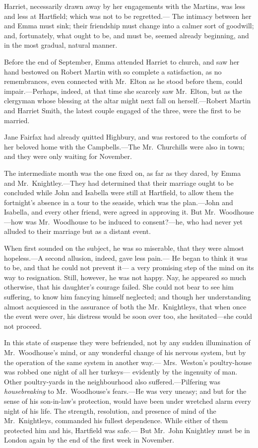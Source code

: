 Harriet, necessarily drawn away by her engagements with the Martins,
was less and less at Hartfield; which was not to be regretted.---%
The intimacy between her and Emma must sink; their friendship must
change into a calmer sort of goodwill; and, fortunately, what ought
to be, and must be, seemed already beginning, and in the most gradual,
natural manner.

Before the end of September, Emma attended Harriet to church, and saw
her hand bestowed on Robert Martin with so complete a satisfaction,
as no remembrances, even connected with Mr.\ Elton as he stood
before them, could impair.---Perhaps, indeed, at that time she
scarcely saw Mr.\ Elton, but as the clergyman whose blessing at the
altar might next fall on herself.---Robert Martin and Harriet Smith,
the latest couple engaged of the three, were the first to be married.

Jane Fairfax had already quitted Highbury, and was restored to the
comforts of her beloved home with the Campbells.---The Mr.\ Churchills
were also in town; and they were only waiting for November.

The intermediate month was the one fixed on, as far as they dared,
by Emma and Mr.\ Knightley.---They had determined that their marriage
ought to be concluded while John and Isabella were still at Hartfield,
to allow them the fortnight's absence in a tour to the seaside,
which was the plan.---John and Isabella, and every other friend,
were agreed in approving it.  But Mr.\ Woodhouse---how was Mr.\ Woodhouse
to be induced to consent?---he, who had never yet alluded to their
marriage but as a distant event.

When first sounded on the subject, he was so miserable, that they
were almost hopeless.---A second allusion, indeed, gave less pain.---%
He began to think it was to be, and that he could not prevent it---%
a very promising step of the mind on its way to resignation.
Still, however, he was not happy.  Nay, he appeared so much otherwise,
that his daughter's courage failed.  She could not bear to see
him suffering, to know him fancying himself neglected; and though
her understanding almost acquiesced in the assurance of both the
Mr.\ Knightleys, that when once the event were over, his distress
would be soon over too, she hesitated---she could not proceed.

In this state of suspense they were befriended, not by any sudden
illumination of Mr.\ Woodhouse's mind, or any wonderful change of his
nervous system, but by the operation of the same system in another way.---%
Mrs.\ Weston's poultry-house was robbed one night of all her turkeys---%
evidently by the ingenuity of man.  Other poultry-yards in the
neighbourhood also suffered.---Pilfering was \emph{housebreaking} to
Mr.\ Woodhouse's fears.---He was very uneasy; and but for the sense
of his son-in-law's protection, would have been under wretched alarm
every night of his life.  The strength, resolution, and presence
of mind of the Mr.\ Knightleys, commanded his fullest dependence.
While either of them protected him and his, Hartfield was safe.---%
But Mr.\ John Knightley must be in London again by the end of the
first week in November.

